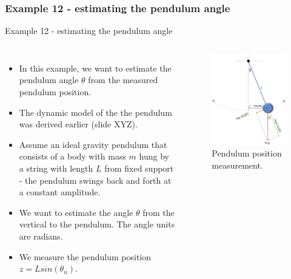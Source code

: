 \subsubsection{Example 12 - estimating the pendulum angle}
\begin{frame}{Example 12 - estimating the pendulum angle}
\label{ex12}
\begin{columns}
\begin{itemize}
    \item In this example, we want to estimate the pendulum angle $\theta$ from the measured pendulum position. 

    \item The dynamic model of the
the pendulum was derived earlier (slide XYZ). 

    \item Assume an ideal gravity
pendulum that consists of a body with mass $m$ hung by a string with length $L$ from
fixed support - the pendulum swings back and forth at a constant amplitude.

    \item We
want to estimate the angle $\theta$ from the vertical to the pendulum. The angle units are
radians.

    \item We measure the pendulum position $z = Lsin(\theta_n)$.
\end{itemize}

\begin{figure}
    \centering
    \includegraphics[width=1\linewidth]{Figures//Part3/ex12_Pendulum.png}
    \caption{Pendulum position measurement.}
\end{figure}
\end{columns}
\end{frame}


